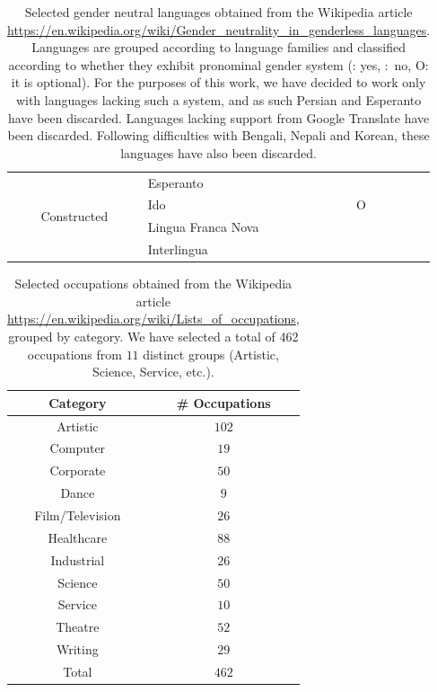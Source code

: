 \documentclass{article}
\newcommand{\xmark}{\ding{53}}%
\begin{document}
\begin{table}[H]
\begin{tabular}{|c|m{2cm}|m{2cm}|c|c|}
	\multirow{4}{*}{Constructed} 	& Esperanto 			& \checkmark 		& \checkmark 	& \xmark		\\
									& Ido 					& O 				& \xmark 		& \xmark 		\\
									\cline{2-2}
									& Lingua Franca Nova 	& \xmark 			& \xmark 		& \xmark 		\\
									\cline{2-2}
									& Interlingua 			& \xmark 			& \xmark 		& \xmark 		\\ \hline
	\end{tabular}
	\caption{Selected gender neutral languages obtained from the Wikipedia article \url{https://en.wikipedia.org/wiki/Gender_neutrality_in_genderless_languages}. Languages are grouped according to language families and classified according to whether they exhibit pronominal gender system (\checkmark: yes, \xmark:~no, O: it is optional). For the purposes of this work, we have decided to work only with languages lacking such a system, and as such Persian and Esperanto have been discarded. Languages lacking support from Google Translate have been discarded. Following difficulties with Bengali, Nepali and Korean, these languages have also been discarded.}
	\label{tab:gender-neutral-languages}
\end{table}

\begin{table}[H]
	\centering
	\begin{tabular}{|c|c|}
	\hline
	Category 		& \# Occupations 	\\ \hline \hline
	Artistic 		& $102$ 			\\ \hline
	Computer 		& $19$ 				\\ \hline
	Corporate 		& $50$ 				\\ \hline
	Dance 			& $9$ 				\\ \hline
	Film/Television & $26$ 				\\ \hline
	Healthcare 		& $88$ 				\\ \hline
	Industrial 		& $26$ 				\\ \hline
	Science 		& $50$ 				\\ \hline
	Service 		& $10$ 				\\ \hline
	Theatre 		& $52$ 				\\ \hline
	Writing 		& $29$ 				\\ \hline
	\hline
	Total			& $462$				\\ \hline
	\end{tabular}
	\caption{Selected occupations obtained from the Wikipedia article \url{https://en.wikipedia.org/wiki/Lists_of_occupations}, grouped by category. We have selected a total of 462 occupations from $11$ distinct groups (Artistic, Science, Service, etc.).}
	\label{tab:occupations}
\end{table}
\end{document}
